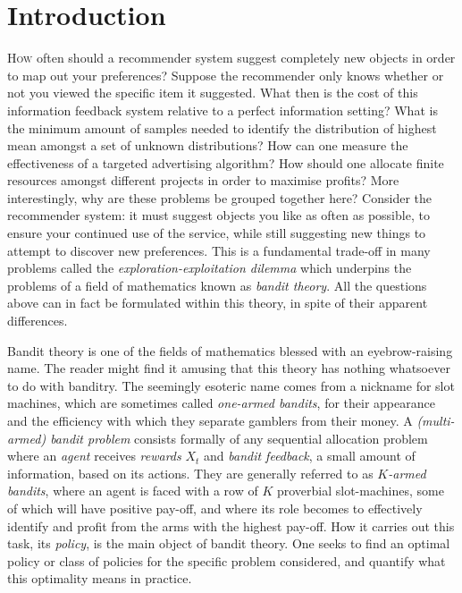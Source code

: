 \chapter*{Introduction}
\lettrine[lines=4]{\textcolor{dropcap}{H}}{ow} often should a recommender system suggest completely new objects in order to map out your preferences? Suppose the recommender only knows whether or not you viewed the specific item it suggested. What then is the cost of this information feedback system relative to a perfect information setting? What is the minimum amount of samples needed to identify the distribution of highest mean amongst a set of unknown distributions? How can one measure the effectiveness of a targeted advertising algorithm? How should one allocate finite resources amongst different projects in order to maximise profits?  More interestingly, why are these problems be grouped together here? Consider the recommender system: it must suggest objects you like as often as possible, to ensure your continued use of the service, while still suggesting new things to attempt to discover new preferences. This is a fundamental trade-off in many problems called the {\em exploration-exploitation dilemma} which underpins the problems of a field of mathematics known as {\em bandit theory}. All the questions above can in fact be formulated within this theory, in spite of their apparent differences. 

\par Bandit theory is one of the fields of mathematics blessed with an eyebrow-raising name. The reader might find it amusing that this theory has nothing whatsoever to do with banditry.  The seemingly esoteric name comes from a nickname for slot machines, which are sometimes called {\em one-armed bandits}, for their appearance and the efficiency with which they separate gamblers from their money. A {\em (multi-armed) bandit problem} consists formally of any sequential allocation problem where an {\em agent} receives {\em rewards} $X_t$ and {\em bandit feedback}, a small amount of information, based on its actions. They are generally referred to as {\em $K$-armed bandits}, where an agent is faced with a row of $K$ proverbial slot-machines, some of which will have positive pay-off, and where its role becomes to effectively identify and profit from the arms with the highest pay-off. How it carries out this task, its {\em policy}, is the main object of bandit theory. One seeks to find an optimal policy or class of policies for the specific problem considered, and quantify what this optimality means in practice.

